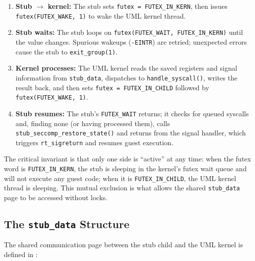 \begin{enumerate}[nosep]
\item \textbf{Stub $\to$ kernel:} The stub sets
  \texttt{futex = FUTEX\_IN\_KERN}, then issues
  \texttt{futex(FUTEX\_WAKE, 1)} to wake the UML kernel thread.
\item \textbf{Stub waits:} The stub loops on
  \texttt{futex(FUTEX\_WAIT, FUTEX\_IN\_KERN)} until the value changes.
  Spurious wakeups (\texttt{-EINTR}) are retried; unexpected errors cause
  the stub to \texttt{exit\_group(1)}.
\item \textbf{Kernel processes:} The UML kernel reads the saved registers and
  signal information from \texttt{stub\_data}, dispatches to
  \texttt{handle\_syscall()}, writes the result back, and then sets
  \texttt{futex = FUTEX\_IN\_CHILD} followed by
  \texttt{futex(FUTEX\_WAKE, 1)}.
\item \textbf{Stub resumes:} The stub's \texttt{FUTEX\_WAIT} returns; it
  checks for queued syscalls and, finding none (or having processed them),
  calls \texttt{stub\_seccomp\_restore\_state()} and returns from the signal
  handler, which triggers \texttt{rt\_sigreturn} and resumes guest execution.
\end{enumerate}

The critical invariant is that only one side is ``active'' at any time: when
the futex word is \texttt{FUTEX\_IN\_KERN}, the stub is sleeping in the
kernel's futex wait queue and will not execute any guest code; when it is
\texttt{FUTEX\_IN\_CHILD}, the UML kernel thread is sleeping.  This mutual
exclusion is what allows the shared \texttt{stub\_data} page to be accessed
without locks.

\subsection{The \texttt{stub\_data} Structure}
\label{sec:impl-stub-data}

The shared communication page between the stub child and the UML kernel is
defined in :

